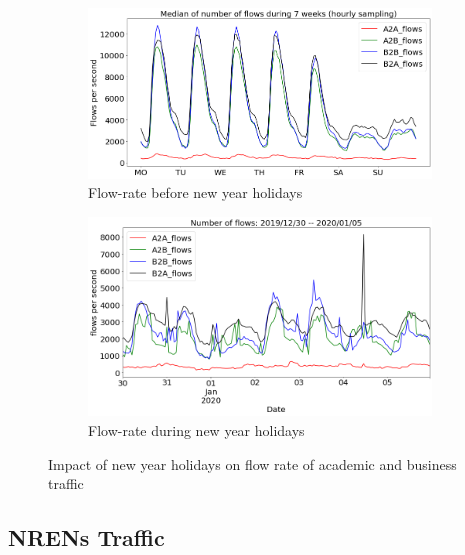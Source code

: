 \documentclass[10pt, journal, letterpaper]{IEEEtran}
\newcommand\figSzeMahdi{0.8}
\begin{document}
\begin{figure}[hbt!]
    \centering
    \begin{subfigure}{\figSzeMahdi\columnwidth}
          \centering
          \includegraphics[width=\columnwidth]{img/BCH_acaBus_fps.png}
          \caption{Flow-rate before new year holidays}
          \label{fig:BCH_acaBus_fps}
    \end{subfigure}
    \begin{subfigure}{\figSzeMahdi\columnwidth}
          \centering
          \includegraphics[width=\columnwidth]{img/CH2_acaBus_fps.png}
          \caption{Flow-rate during new year holidays}
          \label{fig:CH_acaBus_fps}
    \end{subfigure}
    \caption{Impact of new year holidays on flow rate of academic and business traffic}
    \label{fig:flowrate_acaBus_BCH_CH}
\end{figure}

\subsection{NRENs Traffic}
\end{document}
